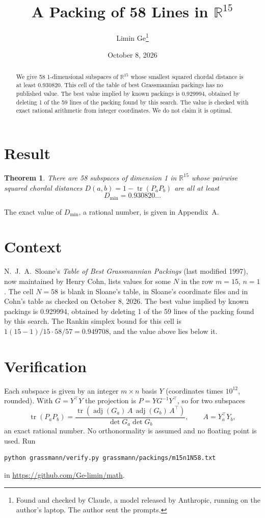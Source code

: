 \documentclass[11pt,a4paper]{article}
\title{A Packing of 58 Lines in $\mathbb{R}^{15}$}
\author{Limin Ge\thanks{Found and checked by Claude, a model released by Anthropic, running on the author's laptop. The author sent the prompts.}}
\date{October 8, 2026}
\newtheorem*{theorem}{Theorem}
\begin{document}
\maketitle
\begin{abstract}
We give 58 1-dimensional subspaces of $\mathbb{R}^{15}$ whose smallest squared chordal distance is at least 0.930820. This cell of the table of best Grassmannian packings has no published value. The best value implied by known packings is 0.929994, obtained by deleting 1 of the 59 lines of the packing found by this search. The value is checked with exact rational arithmetic from integer coordinates. We do not claim it is optimal.
\end{abstract}

\section{Result}
\begin{theorem}
There are 58 subspaces of dimension 1 in $\mathbb{R}^{15}$ whose pairwise squared chordal distances $D(a,b) = 1 - \operatorname{tr}(P_aP_b)$ are all at least
\[ D_{\min} = 0.930820\ldots \]
\end{theorem}
The exact value of $D_{\min}$, a rational number, is given in Appendix~A.


\section{Context}
N.~J.~A.~Sloane's \emph{Table of Best Grassmannian Packings} (last modified 1997), now maintained by Henry Cohn, lists values for some $N$ in the row $m=15$, $n=1$. The cell $N=58$ is blank in Sloane's table, in Sloane's coordinate files and in Cohn's table as checked on October 8, 2026. The best value implied by known packings is 0.929994, obtained by deleting 1 of the 59 lines of the packing found by this search. The Rankin simplex bound for this cell is $1(15-1)/15\cdot 58/57 = 0.949708$, and the value above lies below it.


\section{Verification}
Each subspace is given by an integer $m\times n$ basis $Y$ (coordinates times $10^{12}$, rounded). With $G=Y^\top Y$ the projection is $P=YG^{-1}Y^\top$, so for two subspaces
\[ \operatorname{tr}(P_aP_b)=\frac{\operatorname{tr}(\operatorname{adj}(G_a)\,A\,\operatorname{adj}(G_b)\,A^\top)}{\det G_a\det G_b},\qquad A=Y_a^\top Y_b, \]
an exact rational number. No orthonormality is assumed and no floating point is used. Run
\begin{verbatim}
python grassmann/verify.py grassmann/packings/m15n1N58.txt
\end{verbatim}
in \url{https://github.com/Ge-limin/math}.
\end{document}
